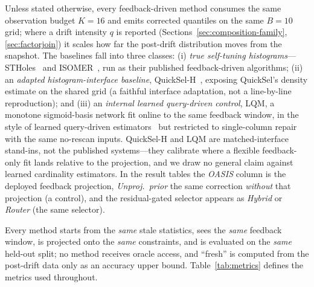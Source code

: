 \documentclass[preprint,12pt]{elsarticle}
\begin{document}
Unless stated otherwise, every feedback-driven method consumes the same observation budget
$K{=}16$ and emits corrected quantiles on the same $B{=}10$ grid; where a drift intensity $q$
is reported (Sections~\ref{sec:composition-family}, \ref{sec:factorjoin}) it scales how far
the post-drift distribution moves from the snapshot. The baselines fall into three classes:
(i) \emph{true self-tuning histograms}---STHoles~\cite{bruno2001stholes} and
ISOMER~\cite{markl2007consistent}, run as their published feedback-driven algorithms;
(ii) an \emph{adapted histogram-interface baseline}, QuickSel-H~\cite{park2020quicksel},
exposing QuickSel's density estimate on the shared grid (a faithful interface adaptation, not a
line-by-line reproduction); and (iii) an \emph{internal learned query-driven control}, LQM, a
monotone sigmoid-basis network fit online to the same feedback window, in the style of learned
query-driven estimators~\cite{kipf2019learned,li2023alece} but restricted to single-column
repair with the same no-rescan inputs. QuickSel-H and LQM are matched-interface stand-ins, not
the published systems---they calibrate where a flexible feedback-only fit lands relative to the
projection, and we draw no general claim against learned cardinality estimators. In the result
tables the \emph{OASIS} column is the deployed feedback projection, \emph{Unproj.\ prior} the
same correction \emph{without} that projection (a control), and the residual-gated selector
appears as \emph{Hybrid} or \emph{Router} (the same selector).

Every method starts from the \emph{same} stale
statistics, sees the \emph{same} feedback window, is projected onto the \emph{same}
constraints, and is evaluated on the \emph{same} held-out split; no method receives
oracle access, and ``fresh'' is computed from the post-drift data only as an accuracy
upper bound. Table~\ref{tab:metrics} defines the metrics used throughout.
\end{document}
